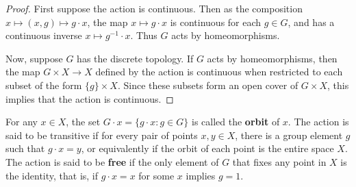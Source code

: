 \begin{proof}
First suppose the action is continuous. Then as the composition $x\mapsto (x,g)\mapsto g\cdot  x$, the map $x\mapsto g\cdot x$ is continuous for each $g\in G$, and has a continuous inverse $x\mapsto g^{-1}\cdot x$. Thus $G$ acts by homeomorphisms.\par
Now, suppose $G$ has the discrete topology. If $G$ acts by homeomorphisms, then the map $G\times X\to X$ defined by the action is continuous when restricted to each subset of the form $\{g\}\times X$. Since these subsets form an open cover of $G\times X$, this implies that the action is continuous.
\end{proof}
For any $x\in X$, the set $G\cdot x=\{g\cdot x:g\in G\}$ is called the \textbf{orbit} of $x$. The action is said to be transitive if for every pair of points $x,y\in X$, there is a group element $g$ such that $g\cdot x=y$, or equivalently if the orbit of each point is the entire space $X$. The action is said to be \textbf{free} if the only element of $G$ that fixes any point in $X$ is the identity, that is, if $g\cdot x=x$ for some $x$ implies $g=1$.
\vspace{5mm}
